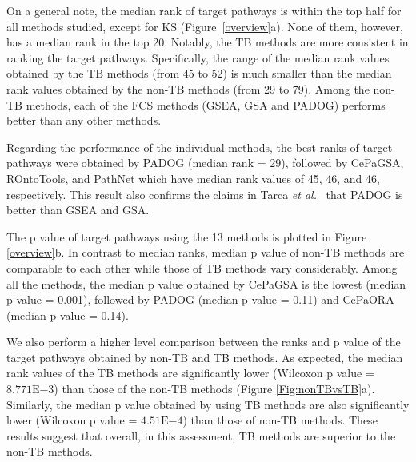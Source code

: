 On a general note, the median rank of target pathways is within the top half for all methods studied, except for KS (Figure~\ref{overview}a). 
None of them, however, has a median rank in the top 20.
Notably, the TB methods are more consistent in ranking the target pathways. 
Specifically, the range of the median rank values obtained by the TB methods (from 45 to 52) is much smaller than the median rank values obtained by the non-TB methods (from 29 to 79). 
Among the non-TB methods, each of the FCS methods (GSEA, GSA and PADOG) performs better than any other methods.

Regarding the performance of the individual methods, the best ranks of target pathways were obtained by PADOG (median rank = 29), followed by CePaGSA, ROntoTools, and PathNet which have median rank values of 45, 46, and 46, respectively. This result also confirms the claims in Tarca \textit{et al.}~\cite{Tarca2012down} that PADOG is better than GSEA and GSA. 

The p value of target pathways using the 13 methods is plotted in Figure \ref{overview}b. In contrast to median ranks, median p value of non-TB methods are comparable to each other while those of TB methods vary considerably.
Among all the methods, the median p value obtained by CePaGSA is the lowest (median p value = 0.001), followed by PADOG (median p value = 0.11) and  CePaORA (median p value = 0.14). 

We also perform a higher level comparison between the ranks and p value of the target pathways obtained by non-TB and TB methods.
As expected, the median rank values of the TB methods are significantly lower (Wilcoxon p value = $8.771\mathrm{E}{-3}$) than those of the non-TB methods (Figure \ref{Fig:nonTBvsTB}a). 
Similarly, the median p value obtained by using TB methods are also significantly lower (Wilcoxon p value = $4.51\mathrm{E}{-4}$) than those of non-TB methods. These results suggest that overall, in this assessment, TB methods are superior to the non-TB methods. 


